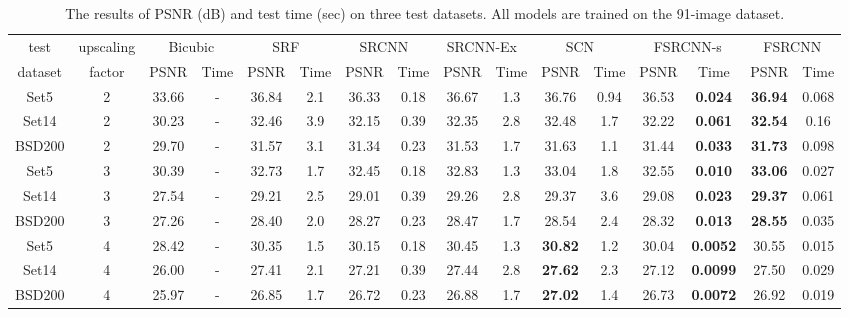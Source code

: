 \documentclass[runningheads]{llncs}
\begin{document}
\begin{table*}\scriptsize
\caption{The results of PSNR (dB) and test time (sec) on three test datasets. All models are trained on the 91-image dataset. }\label{results91}
\begin{center}
\begin{tabular}{|c|c|c|c|c|c|c|c|c|c|c|c|c|c|c|c|}
\hline
 test & upscaling &  \multicolumn{2}{c|}{Bicubic} &  \multicolumn{2}{c|}{SRF~\cite{Schulter2015}} &  \multicolumn{2}{c|}{SRCNN~\cite{Dong2014}} &  \multicolumn{2}{c|}{SRCNN-Ex~\cite{Dong2015}} &\multicolumn{2}{c|}{SCN~\cite{Wang2015}} & \multicolumn{2}{c|}{FSRCNN-s} & \multicolumn{2}{c|}{FSRCNN}\\
 \cline{3-16}
 dataset & factor & PSNR&Time & PSNR&Time& PSNR&Time &PSNR&Time & PSNR&Time &PSNR&Time& PSNR&Time\\

\hline\hline
Set5 & 2 & 33.66 & -& 36.84 & 2.1 & 36.33 & 0.18 & 36.67 & 1.3 &36.76 & 0.94 & 36.53 & \textbf{0.024} & \textbf{36.94} &0.068 \\
Set14 & 2 & 30.23 & -& 32.46 & 3.9 & 32.15 & 0.39 & 32.35 & 2.8 & 32.48 & 1.7 & 32.22 & \textbf{0.061} & \textbf{32.54} &0.16 \\
BSD200 & 2 & 29.70 &- & 31.57 & 3.1 & 31.34 & 0.23 & 31.53 & 1.7 & 31.63 & 1.1 & 31.44 &\textbf{0.033}& \textbf{31.73} &0.098 \\
\hline\hline

Set5 & 3 & 30.39 & -& 32.73 & 1.7 & 32.45 & 0.18& 32.83 & 1.3 & 33.04 & 1.8 & 32.55 &\textbf{0.010}& \textbf{33.06} &0.027 \\
Set14 & 3 & 27.54 & -& 29.21 & 2.5 & 29.01 & 0.39& 29.26 & 2.8 &29.37 & 3.6 & 29.08 &\textbf{0.023}& \textbf{29.37} &0.061 \\
BSD200 & 3 & 27.26 &- & 28.40 & 2.0 & 28.27 & 0.23& 28.47 & 1.7 &28.54 & 2.4 & 28.32 &\textbf{0.013}& \textbf{28.55} &0.035 \\
\hline\hline

Set5 & 4 & 28.42 & -& 30.35 & 1.5 & 30.15 & 0.18 & 30.45 & 1.3& \textbf{30.82} & 1.2 & 30.04 & \textbf{0.0052} & 30.55 &0.015 \\
Set14 & 4 & 26.00 & -& 27.41 & 2.1 & 27.21 & 0.39 & 27.44 & 2.8& \textbf{27.62} & 2.3 & 27.12 & \textbf{0.0099} & 27.50 & 0.029 \\
BSD200 & 4 & 25.97 &- & 26.85 & 1.7 & 26.72 & 0.23 & 26.88 & 1.7 & \textbf{27.02} & 1.4 & 26.73 & \textbf{0.0072} & 26.92 &0.019 \\
\hline
\end{tabular}
\end{center}
\end{table*}
\end{document}
